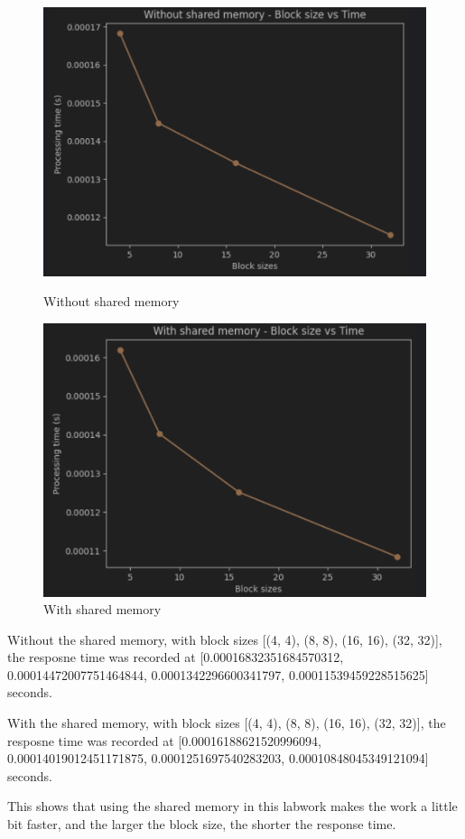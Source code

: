 \documentclass{article}
\begin{document}
\begin{figure}[!htb]
    \begin{minipage}{0.48\textwidth}
        \centering
        \includegraphics[width=.7\linewidth]{Without shared memory - Block size vs Time.png}
        \caption{Without shared memory}
        \label{fig:1D Without shared memory}
    \end{minipage}\hfill
    \begin{minipage}{0.48\textwidth}
        \centering
        \includegraphics[width=.7\linewidth]{With shared memory - Response time according to block size.png}
        \caption{With shared memory}
        \label{fig:2D With shared memory}
    \end{minipage}\hfill
\end{figure}

Without the shared memory, with block sizes [(4, 4), (8, 8), (16, 16), (32, 32)], the resposne time was recorded at [0.00016832351684570312, 0.00014472007751464844, 0.0001342296600341797, 0.00011539459228515625] seconds.

With the shared memory, with block sizes [(4, 4), (8, 8), (16, 16), (32, 32)], the resposne time was recorded at [0.00016188621520996094, 0.00014019012451171875, 0.0001251697540283203, 0.00010848045349121094] seconds.

This shows that using the shared memory in this labwork makes the work a little bit faster, and the larger the block size, the shorter the response time.
\end{document}
